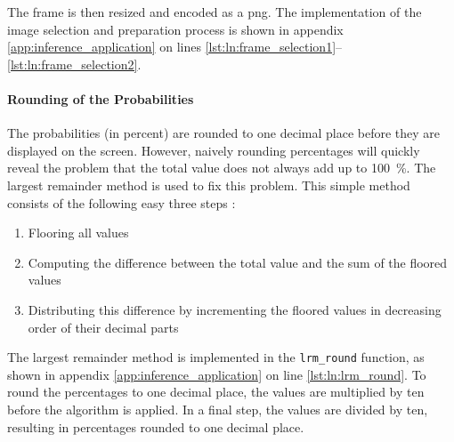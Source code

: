 The frame is then resized and encoded as a \acrshort{png}.
The implementation of the image selection and preparation process is shown in appendix \ref{app:inference_application} on lines \ref{lst:ln:frame_selection1}--\ref{lst:ln:frame_selection2}.

\paragraph{Rounding of the Probabilities}
The probabilities (in percent) are rounded to one decimal place before they are displayed on the screen.
However, naively rounding percentages will quickly reveal the problem that the total value does not always add up to \SI{100}{\percent}.
The largest remainder method is used to fix this problem.
This simple method consists of the following easy three steps \cite{inf_percentage}:
\begin{enumerate}
  \item Flooring all values
  \item Computing the difference between the total value and the sum of the floored values
  \item Distributing this difference by incrementing the floored values in decreasing order of their decimal parts
\end{enumerate}

The largest remainder method is implemented in the \texttt{lrm\_round} function, as shown in appendix \ref{app:inference_application} on line \ref{lst:ln:lrm_round}.
To round the percentages to one decimal place, the values are multiplied by ten before the algorithm is applied.
In a final step, the values are divided by ten, resulting in percentages rounded to one decimal place.
